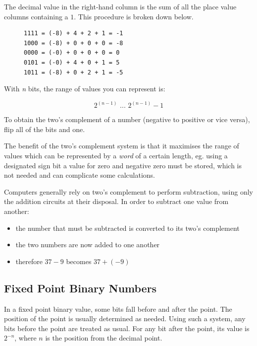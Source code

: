 \documentclass[9pt]{article}
\begin{document}
The decimal value in the right-hand column is the sum of all the place value columns containing a \(1\). This procedure is broken down below.

\begin{figure}[H]
\begin{verbatim}
1111 = (-8) + 4 + 2 + 1 = -1
1000 = (-8) + 0 + 0 + 0 = -8
0000 = (-0) + 0 + 0 + 0 = 0
0101 = (-0) + 4 + 0 + 1 = 5
1011 = (-8) + 0 + 2 + 1 = -5
\end{verbatim}
\end{figure}


With \emph{n} bits, the range of values you can represent is:

\[2^{(n-1)}  \text{ ... } 2^{(n-1)}  - 1\]

To obtain the two's complement of a number (negative to positive or vice versa), flip all of the bits and one.

The benefit of the two's complement system is that it maximises the range of values which can be represented by a \emph{word} of a certain length, eg. using a designated sign bit a value for zero and negative zero must be stored, which is not needed and can complicate some calculations.

Computers generally rely on two's complement to perform subtraction, using only the addition circuits at their disposal. In order to subtract one value from another:

\begin{itemize}
\item the number that must be subtracted is converted to its two's complement
\item the two numbers are now added to one another
\item therefore \(37 - 9\) becomes \(37 + (-9)\)
\end{itemize}

\subsection{Fixed Point Binary Numbers}
\label{sec:orgec6a043}

In a fixed point binary value, some bits fall before and after the point. The position of the point is usually determined as needed. Using such a system, any bits before the point are treated as usual. For any bit after the point, its value is \(2^{-n}\), where \(n\) is the position from the decimal point.
\end{document}
